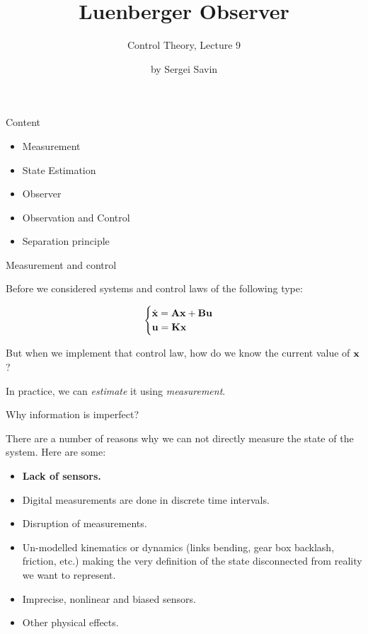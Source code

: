 \documentclass{beamer}
\title{Luenberger Observer}
\subtitle{Control Theory, Lecture 9}
\author{by Sergei Savin}
\date{\mydate}
\begin{document}
\maketitle



\begin{frame}{Content}
\begin{itemize}
\item Measurement
\item State Estimation
\item Observer
\item Observation and Control
\item Separation principle
\end{itemize}
\end{frame}




\begin{frame}{Measurement and control}
\begin{flushleft}

Before we considered systems and control laws of the following type:

\begin{equation}
\begin{cases}
\dot {\mathbf{x}} = \mathbf{A} \mathbf{x} + \mathbf{B} \mathbf{u}\\
\mathbf{u} = \mathbf{K} \mathbf{x}
\end{cases}
\end{equation}

But when we implement that control law, how do we know the current value of $\mathbf{x}$?

\bigskip

In practice, we can \emph{estimate} it using \emph{measurement}.

\end{flushleft}
\end{frame}

\begin{frame}{Why information is imperfect?}
\begin{flushleft}

There are a number of reasons why we can not directly measure the state of the system. Here are some:

\begin{itemize}
\item \textbf{Lack of sensors.}
\item Digital measurements are done in discrete time intervals.
\item Disruption of measurements.
\item Un-modelled kinematics or dynamics (links bending, gear box backlash, friction, etc.) making the very definition of the state disconnected from reality we want to represent.
\item Imprecise, nonlinear and biased sensors.
\item Other physical effects.
\end{itemize}

\end{flushleft}
\end{frame}
\end{document}
